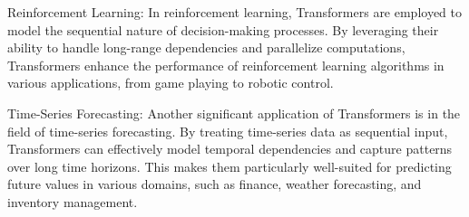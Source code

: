 \par{Reinforcement Learning:} In reinforcement learning, Transformers are employed to model the sequential nature of decision-making processes. By leveraging their ability to handle long-range dependencies and parallelize computations, Transformers enhance the performance of reinforcement learning algorithms in various applications, from game playing to robotic control.

\par{Time-Series Forecasting:} Another significant application of Transformers is in the field of time-series forecasting. By treating time-series data as sequential input, Transformers can effectively model temporal dependencies and capture patterns over long time horizons. This makes them particularly well-suited for predicting future values in various domains, such as finance, weather forecasting, and inventory management.
